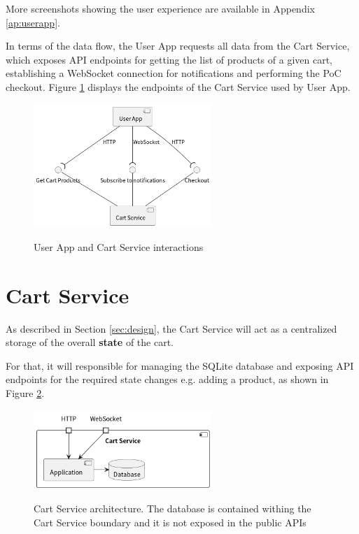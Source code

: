 More screenshots showing the user experience are available in Appendix \ref{ap:userapp}.

In terms of the data flow, the User App requests all data from the Cart
Service, which exposes API endpoints for getting the list of products of a
given cart, establishing a WebSocket connection for notifications and
performing the PoC checkout. Figure \ref{fig:userappdataflow} displays the
endpoints of the Cart Service used by User App.

\begin{figure}[H]
	\centering
	\caption[User App and Cart Service interactions]{User App and Cart Service interactions}
    \includegraphics[width=0.6\textwidth]{./images/diagrams/UserApp.png}
	\fonte{}
	\label{fig:userappdataflow}
\end{figure}

\section{Cart Service}

As described in Section \ref{sec:design}, the Cart Service will act as a
centralized storage of the overall \textbf{state} of the cart.

For that, it will responsible for managing the SQLite database and exposing API
endpoints for the required state changes e.g. adding a product, as shown in 
Figure \ref{fig:cartservicearch}.

\begin{figure}[H]
	\centering
    \caption[Cart Service architecture]{Cart Service architecture. The database
    is contained withing the Cart Service boundary and it is not exposed in the
    public APIs}
	\includegraphics[width=0.6\textwidth]{./images/diagrams/CartService.png}
	\fonte{}
	\label{fig:cartservicearch}
\end{figure}

